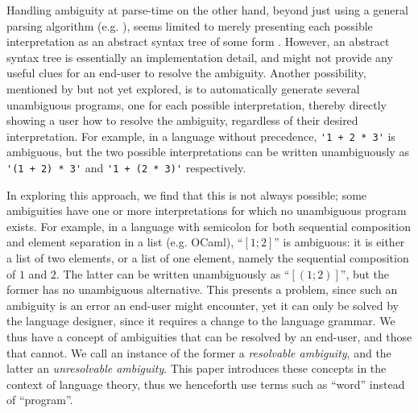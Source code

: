 \documentclass[acmsmall,review,anonymous]{acmart}\settopmatter{printfolios=true,printccs=false,printacmref=false}
\begin{document}
Handling ambiguity at parse-time on the other hand, beyond just using a general parsing algorithm (e.g. \cite{earleyEfficientContextfreeParsing1970,scottGLLParsing2010,youngerRecognitionParsingContextfree1967}), seems limited to merely presenting each possible interpretation as an abstract syntax tree of some form \cite{palmkvistCreatingDomainSpecificLanguages2019,danielssonParsingMixfixOperators2011}. However, an abstract syntax tree is essentially an implementation detail, and might not provide any useful clues for an end-user to resolve the ambiguity. Another possibility, mentioned by \citet{palmkvistCreatingDomainSpecificLanguages2019} but not yet explored, is to automatically generate several unambiguous programs, one for each possible interpretation, thereby directly showing a user how to resolve the ambiguity, regardless of their desired interpretation. For example, in a language without precedence, \verb|'1 + 2 * 3'| is ambiguous, but the two possible interpretations can be written unambiguously as \verb|'(1 + 2) * 3'| and \verb|'1 + (2 * 3)'| respectively.

In exploring this approach, we find that this is not always possible; some ambiguities have one or more interpretations for which no unambiguous program exists. For example, in a language with semicolon for both sequential composition and element separation in a list (e.g. OCaml), ``$[1; 2]$'' is ambiguous: it is either a list of two elements, or a list of one element, namely the sequential composition of $1$ and $2$. The latter can be written unambiguously as ``$[(1; 2)]$'', but the former has no unambiguous alternative. This presents a problem, since such an ambiguity is an error an end-user might encounter, yet it can only be solved by the language designer, since it requires a change to the language grammar. We thus have a concept of ambiguities that can be resolved by an end-user, and those that cannot. We call an instance of the former a \emph{resolvable ambiguity}, and the latter an \emph{unresolvable ambiguity}. This paper introduces these concepts in the context of language theory, thus we henceforth use terms such as ``word'' instead of ``program''.


\end{document}
